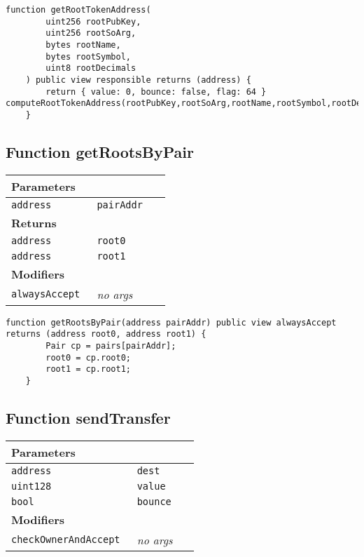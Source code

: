\vspace{2cm}

\begin{lstlisting}[firstnumber=213]
	function getRootTokenAddress(
		uint256 rootPubKey,
		uint256 rootSoArg,
		bytes rootName,
		bytes rootSymbol,
		uint8 rootDecimals
	) public view responsible returns (address) {
		return { value: 0, bounce: false, flag: 64 } computeRootTokenAddress(rootPubKey,rootSoArg,rootName,rootSymbol,rootDecimals);
	}
\end{lstlisting}

\subsection{Function getRootsByPair}


\ifsoltables
\noindent\begin{tabular}{|l|l|p{5cm}|}\hline
\multicolumn{3}{|l|}{\bf Parameters}\\\hline
\tt address & \tt pairAddr &\\\hline
\multicolumn{3}{|l|}{\bf Returns}\\\hline
\tt address & \tt root0 &\\\hline
\tt address & \tt root1 &\\\hline
\multicolumn{3}{|l|}{\bf Modifiers}\\\hline
\tt alwaysAccept & {\em no args} &\\\hline
\end{tabular}
\fi

\vspace{2cm}

\begin{lstlisting}[firstnumber=322]
	function getRootsByPair(address pairAddr) public view alwaysAccept returns (address root0, address root1) {
		Pair cp = pairs[pairAddr];
		root0 = cp.root0;
		root1 = cp.root1;
	}
\end{lstlisting}

\subsection{Function sendTransfer}


\ifsoltables
\noindent\begin{tabular}{|l|l|p{5cm}|}\hline
\multicolumn{3}{|l|}{\bf Parameters}\\\hline
\tt address & \tt dest &\\\hline
\tt uint128 & \tt value &\\\hline
\tt bool & \tt bounce &\\\hline
\multicolumn{3}{|l|}{\bf Modifiers}\\\hline
\tt checkOwnerAndAccept & {\em no args} &\\\hline
\end{tabular}
\fi

